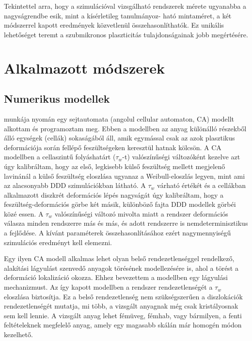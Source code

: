 \documentclass[a5paper,twoside,10pt]{article}
\begin{document}
Tekintettel arra, hogy a szimulációval vizsgálható rendszerek mérete ugyanabba a nagyságrendbe esik, mint a kísérletileg tanulmányoz- ható mintaméret, a két módszerrel kapott eredmények közvetlenül összehasonlíthatók. Ez unikális lehetőséget teremt a szubmikronos plaszticitás tulajdonságainak jobb megértésére.

\section*{Alkalmazott módszerek}
\subsection*{Numerikus modellek}

 munkája nyomán egy sejtautomata (angolul cellular automaton, CA) modellt alkottam és programoztam meg. Ebben a modellben az anyag különálló részekből álló egységek (cellák) sokaságából áll, amik egymással csak az azok plasztikus deformációja során fellépő feszültségeken keresztül hatnak kölcsön. A CA modellben a cellaszintű folyáshatárt ($\tau_w$-t) valószínűségi változóként kezelve azt úgy kalibráltam, hogy az első, legkisebb külső feszültség mellett megjelenő lavinánál a külső feszültség eloszlása ugyanaz a Weibull-eloszlás legyen, mint ami az alacsonyabb DDD szimulációkban látható. A $\tau_w$ várható értékét és a cellákban alkalmazott diszkrét deformációs lépés nagyságát úgy kalibráltam, hogy a feszültség-deformációs görbe két másik, különböző fajta DDD modellek görbéi közé essen. A $\tau_w$ valószínűségi változó mivolta miatt a rendszer deformációs válasza minden rendszerre más és más, és adott rendszerre is nemdeterminisztikus a fejlődése. A kívánt paraméterek összehasonlításához ezért nagymennyiségű szimulációs eredményt kell elemezni.

Egy ilyen CA modell alkalmas lehet olyan belső rendezetlenséggel rendelkező, alakítási lágyulást szenvedő anyagok törésének modellezésére is, ahol a törést a deformáció lokalizáció okozza. Ehhez bevezettem a modellben egy lágyulási mechanizmust. Az így kapott modellben a rendszer rendezetlenségét a $\tau_w$ eloszlása biztosítja. Ez a belső rendezetlenség nem szükségszerűen a diszlokációk rendezetlenségét mutatja, mi több, a vizsgált anyagnak még csak kristályosnak sem kell lennie. A vizsgált anyag lehet fémüveg, fémhab, vagy bármilyen, a fenti feltételeknek megfelelő anyag, amely egy magasabb skálán már homogén módon kezelhető.
\end{document}
